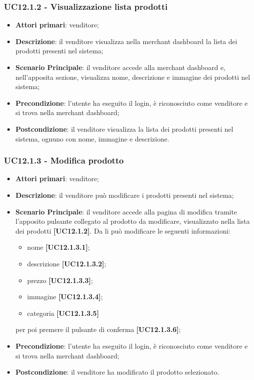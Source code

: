 \subsubsection{UC12.1.2 - Visualizzazione lista prodotti}
\begin{itemize}
\item \textbf{Attori primari}: venditore;
\item \textbf{Descrizione}: il venditore visualizza nella merchant dashboard la lista dei prodotti presenti nel sistema;
\item \textbf{Scenario Principale}: il venditore accede alla merchant dashboard e, nell'apposita sezione, visualizza nome, descrizione e immagine dei prodotti nel sistema;
\item \textbf{Precondizione}: l'utente ha eseguito il login, è riconosciuto come venditore e si trova nella merchant dashboard;
\item \textbf{Postcondizione}: il venditore visualizza la lista dei prodotti presenti nel sistema, ognuno con nome, immagine e descrizione.
\end{itemize}

\subsubsection{UC12.1.3 - Modifica prodotto}
\begin{itemize}
\item \textbf{Attori primari}: venditore;
\item \textbf{Descrizione}: il venditore può modificare i prodotti presenti nel sistema;
\item \textbf{Scenario Principale}: il venditore accede alla pagina di modifica tramite l'apposito pulsante collegato al prodotto da modificare, visualizzato nella lista dei prodotti \textbf{[UC12.1.2]}. Da li può modificare le seguenti informazioni:
\begin{itemize}
	\item nome \textbf{[UC12.1.3.1]};
	\item descrizione \textbf{[UC12.1.3.2]};
	\item prezzo \textbf{[UC12.1.3.3]};
	\item immagine \textbf{[UC12.1.3.4]};
	\item categoria \textbf{[UC12.1.3.5]}
\end{itemize}
per poi premere il pulsante di conferma \textbf{[UC12.1.3.6]};
\item \textbf{Precondizione}: l'utente ha eseguito il login, è riconosciuto come venditore e si trova nella merchant dashboard;
\item \textbf{Postcondizione}: il venditore ha modificato il prodotto selezionato.
\end{itemize}

